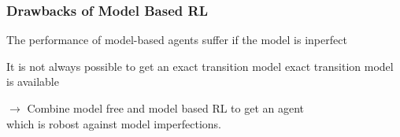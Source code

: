\begin{frame}
    \frametitle{Drawbacks of Model Based RL}


\begin{PraesentationAufzaehlung}
    \item The performance of model-based agents suffer if the model is inperfect\\
    \item It is not always possible to get an exact transition model
exact transition model is available
\end{PraesentationAufzaehlung}

$\rightarrow$ Combine model free and model based RL to get an agent\\
\hspace{8mm} which is robost against model imperfections.
\end{frame}
\clearpage











